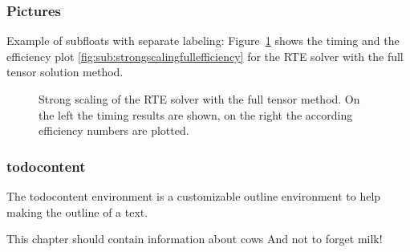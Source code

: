 \subsubsection{Pictures}
Example of subfloats with separate labeling:
Figure~\ref{fig:strongscalingfull} shows the timing  and the efficiency plot \ref{fig:sub:strongscalingfullefficiency} for the RTE solver with the full tensor solution method.
\begin{figure}[h]
    \centering
    \caption{Strong scaling of the RTE solver with the full tensor method. On the left the timing results are shown, on the right the according efficiency numbers are plotted.}
    \label{fig:strongscalingfull}
\end{figure}

\subsubsection{todocontent}
The todocontent environment is a customizable outline environment to help making the outline of a text.
\begin{todocontent}
    \1 This chapter should contain information about cows
    \1 And not to forget milk!
\end{todocontent}
